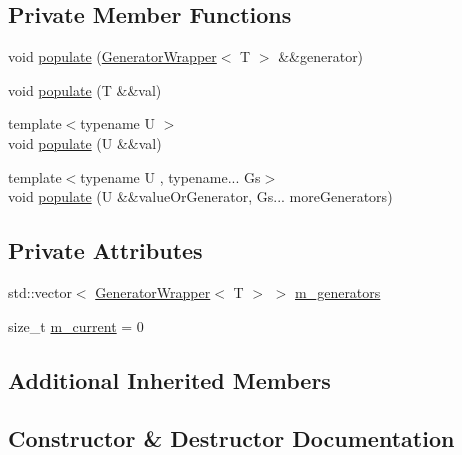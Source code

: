 \subsection*{Private Member Functions}
\begin{DoxyCompactItemize}
\item 
void \mbox{\hyperlink{class_catch_1_1_generators_1_1_generators_a56e1b82d4c9c952076cd58efbf7a4572}{populate}} (\mbox{\hyperlink{class_catch_1_1_generators_1_1_generator_wrapper}{Generator\+Wrapper}}$<$ T $>$ \&\&generator)
\item 
void \mbox{\hyperlink{class_catch_1_1_generators_1_1_generators_ad708036fa5a9bf0cd1520ce111bc851d}{populate}} (T \&\&val)
\item 
{\footnotesize template$<$typename U $>$ }\\void \mbox{\hyperlink{class_catch_1_1_generators_1_1_generators_a8ff8b7dda734d1808b644fefc67f4c98}{populate}} (U \&\&val)
\item 
{\footnotesize template$<$typename U , typename... Gs$>$ }\\void \mbox{\hyperlink{class_catch_1_1_generators_1_1_generators_a4b9680ee28e48e4dc4c4538b5510e649}{populate}} (U \&\&value\+Or\+Generator, Gs... more\+Generators)
\end{DoxyCompactItemize}
\subsection*{Private Attributes}
\begin{DoxyCompactItemize}
\item 
std\+::vector$<$ \mbox{\hyperlink{class_catch_1_1_generators_1_1_generator_wrapper}{Generator\+Wrapper}}$<$ T $>$ $>$ \mbox{\hyperlink{class_catch_1_1_generators_1_1_generators_a4d41bb9f0e8d726a8a53c86354bf19de}{m\+\_\+generators}}
\item 
size\+\_\+t \mbox{\hyperlink{class_catch_1_1_generators_1_1_generators_a8f5cd6b2479cfadbd45033c4ad17ff0c}{m\+\_\+current}} = 0
\end{DoxyCompactItemize}
\subsection*{Additional Inherited Members}


\subsection{Constructor \& Destructor Documentation}
\mbox{\label{class_catch_1_1_generators_1_1_generators_a0288170b30cd0fdfef6efc2d9bc8acba}} 
